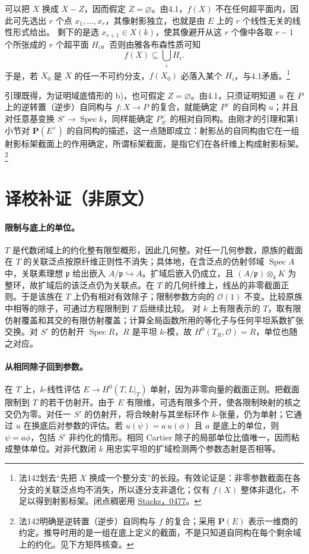 \documentclass[openany,fontset=fandol]{ctexbook}
\DeclareMathOperator{\Spec}{Spec}
\newcommand{\OO}{\mathcal O}
\newcommand{\PP}{\mathbf P}
\begin{document}
可以把 \(X\) 换成 \(X-Z\)，因而假定 \(Z=\varnothing\)。由4.1，\(f(X)\) 不在任何超平面内，因此可先选出 \(r\) 个点 \(x_1,\ldots,x_r\)，其像射影独立，也就是由 \(E\) 上的 \(r\) 个线性无关的线性形式给出。
剩下的是选 \(x_{r+1}\in X(k)\)，使其像避开从这 \(r\) 个像中各取 \(r-1\) 个所张成的 \(r\) 个超平面 \(H_i\)。否则由雅各布森性质可知
\[
 f(X)\subseteq\bigcup_i H_i .
\]
于是，若 \(X_0\) 是 \(X\) 的任一不可约分支，\(f(X_0)\) 必落入某个 \(H_i\)，与4.1矛盾。\footnote{法142划去“先把 \(X\) 换成一个整分支”的长段。有效论证是：非零参数截面在各分支的关联泛点均不消失，所以逐分支非退化；仅有 \(f(X)\) 整体非退化，不足以得到射影标架。闭点稠密用 \href{https://stacks.math.columbia.edu/tag/0477}{Stacks，0477}。}

引理既得，为证明域底情形的 b)，也可假定 \(Z=\varnothing\)。由4.1，只须证明知道 \(u\) 在 \(P\) 上的逆转置（逆步）自同构与 \(f:X\to P\) 的复合，就能确定 \(P^\vee\) 的自同构 \(u\)；并且对任意基变换 \(S'\to\Spec k\)，同样能确定 \(P^\vee_{S'}\) 的相对自同构。由刚才的引理和第1小节对 \(\PP(E^\vee)\) 的自同构的描述，这一点随即成立：射影丛的自同构由它在一组射影标架截面上的作用确定，所谓标架截面，是指它们在各纤维上构成射影标架。\footnote{法142明确是逆转置（逆步）自同构与 \(f\) 的复合；采用 \(\PP(E)\) 表示一维商的约定。推导时用的是一组在底上定义的截面，不是只知道自同构在每个剩余域上的约化。见下方矩阵核查。}

\section*{译校补证（非原文）}
\paragraph{限制与底上的单位。}
\(T\) 是代数闭域上的约化整有限型概形，因此几何整。对任一几何参数，原族的截面在 \(T\) 的关联泛点按原纤维正则性不消失；具体地，在含泛点的仿射邻域 \(\Spec A\) 中，关联素理想 \(\mathfrak p\) 给出嵌入 \(A/\mathfrak p\hookrightarrow A\)。扩域后嵌入仍成立，且 \((A/\mathfrak p)\otimes_k K\) 为整环，故扩域后的该泛点仍为关联点。在 \(T\) 的几何纤维上，线丛的非零截面正则。于是该族在 \(T\) 上仍有相对有效除子；限制参数方向的 \(\OO(1)\) 不变。比较原族中相等的除子，可通过方程限制到 \(T\) 后继续比较。
对 \(k\) 上有限表示的 \(T\)，取有限仿射覆盖和其交的有限仿射覆盖；计算全局函数所用的等化子与任何平坦系数扩张交换。对 \(S'\) 的仿射开 \(\Spec R\)，\(R\) 是平坦 \(k\)-模，故 \(H^0(T_R,\OO)=R\)，单位也随之对应。

\paragraph{从相同除子回到参数。}
在 \(T\) 上，\(k\)-线性评估 \(E\to H^0(T,L|_T)\) 单射，因为非零向量的截面正则。把截面限制到 \(T\) 的若干仿射开。由于 \(E\) 有限维，可选有限多个开，使各限制映射的核之交仍为零。对任一 \(S'\) 的仿射开，将合映射与其坐标环作 \(k\)-张量，仍为单射；它通过 \(u\) 在换底后对参数的评估。若 \(u(\psi)=a\,u(\phi)\) 且 \(a\) 是底上的单位，则 \(\psi=a\phi\)，包括 \(S'\) 非约化的情形。相同 Cartier 除子的局部单位比值唯一，因而粘成整体单位。对非代数闭 \(k\) 用忠实平坦的扩域检测两个参数态射是否相等。
\end{document}
